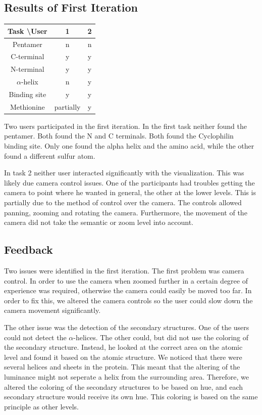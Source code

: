 \documentclass[review,journal]{vgtc}         %
\begin{document}
\subsection{Results of First Iteration}
\begin{tabular}{| c | c | c |}
	\hline
	Task \textbackslash User & 1 & 2  \\
	\hline
	Pentamer       & n & n \\
	\hline
	C-terminal     & y & y \\
	\hline
	N-terminal     & y & y \\
	\hline
	$\alpha$-helix & n & y \\
	\hline
	Binding site   & y & y\\
	\hline
	Methionine      & partially & y \\
	\hline
\end{tabular}
Two users participated in the first iteration. 
In the first task neither found the pentamer. 
Both found the N and C terminals. 
Both found the Cyclophilin binding site. 
Only one found the alpha helix and the amino acid, while the other found a different sulfur atom.

In task 2 neither user interacted significantly with the visualization. This was likely due camera control issues. 
One of the participants had troubles getting the camera to point where he wanted in general, the other at the lower levels.
This is partially due to the method of control over the camera. 
The controls allowed panning, zooming and rotating the camera. 
Furthermore, the movement of the camera did not take the semantic or zoom level into account.

\subsection{Feedback}
Two issues were identified in the first iteration. 
The first problem was camera control. 
In order to use the camera when zoomed further in a certain degree of experience was required, otherwise the camera could easily be moved too far.
In order to fix this, we altered the camera controls so the user could slow down the camera movement significantly.

The other issue was the detection of the secondary structures. 
One of the users could not detect the $\alpha$-helices. The other could, but did not use the coloring of the secondary structure.
Instead, he looked at the correct area on the atomic level and found it based on the atomic structure.
We noticed that there were several helices and sheets in the protein. 
This meant that the altering of the luminance might not seperate a helix from the surrounding area. 
Therefore, we altered the coloring of the secondary structures to be based on hue, and each secondary structure would receive its own hue.
This coloring is based on the same principle as other levels.
\end{document}
